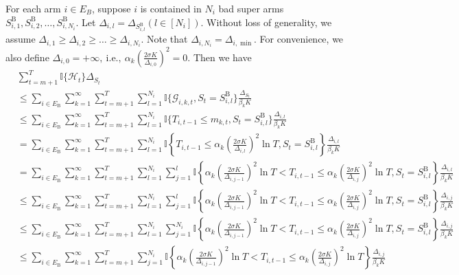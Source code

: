 \documentclass[opre,sglanonrev]{informs4}
\begin{document}
For each arm $i\in E_B$, suppose $i$ is contained in $N_i$ bad super arms $S_{i,1}^\mathrm{B},S_{i,2}^\mathrm{B},\ldots,S_{i,N_i}^\mathrm{B}$. Let $\Delta_{i,l} = \Delta_{S_{i,l}^\mathrm{B}}(l\in[N_i])$. Without loss of generality, we assume $\Delta_{i,1}\geq\Delta_{i,2}\geq\ldots\geq\Delta_{i,N_i}$. Note that $\Delta_{i,N_i}=\Delta_{i,\min}$. For convenience, we also define $\Delta_{i,0}=+\infty,\mathrm{~i.e.,~}\alpha_k\left(\frac{2\sigma K}{\Delta_{i,0}}\right)^2=0$. Then we have
$$\begin{aligned}
 & \sum_{t=m+1}^T\mathbb{I}\{\mathcal{H}_t\}\Delta_{S_t} \\
 & \leq\sum_{i\in E_\mathrm{B}}\sum_{k=1}^\infty\sum_{t=m+1}^T\sum_{l=1}^{N_i}\mathbb{I}\{\mathcal{G}_{i,k,t},S_t=S_{i,l}^\mathrm{B}\}\frac{\Delta_{S_t}}{\beta_kK} \\
 & \leq\sum_{i\in E_\mathrm{B}}\sum_{k=1}^\infty\sum_{t=m+1}^T\sum_{l=1}^{N_i}\mathbb{I}\{T_{i,t-1}\leq m_{k,t},S_t=S_{i,l}^\mathrm{B}\}\frac{\Delta_{i,l}}{\beta_kK} \\
 & =\sum_{i\in E_\mathrm{B}}\sum_{k=1}^\infty\sum_{t=m+1}^T\sum_{l=1}^{N_i}\mathbb{I}\left\{T_{i,t-1}\leq\alpha_k\left(\frac{2\sigma K}{\Delta_{i,l}}\right)^2\ln T,S_t=S_{i,l}^\mathrm{B}\right\}\frac{\Delta_{i,l}}{\beta_kK} \\
 & =\sum_{i\in E_{\mathrm{B}}}\sum_{k=1}^{\infty}\sum_{t=m+1}^{T}\sum_{l=1}^{N_{i}}\sum_{j=1}^{l}\mathbb{I}\left\{\alpha_k\left(\frac{2\sigma K}{\Delta_{i,j-1}}\right)^{2}\ln T<T_{i,t-1}\leq\alpha_k\left(\frac{2\sigma K}{\Delta_{i,j}}\right)^{2}\ln T,S_{t}=S_{i,l}^{\mathrm{B}}\right\}\frac{\Delta_{i,l}}{\beta_{k}K} \\
 &\leq\sum_{i\in E_{\mathrm{B}}}\sum_{k=1}^{\infty}\sum_{t=m+1}^{T}\sum_{l=1}^{N_{i}}\sum_{j=1}^{l}\mathbb{I}\left\{\alpha_k\left(\frac{2\sigma K}{\Delta_{i,j-1}}\right)^{2}\ln T<T_{i,t-1}\leq\alpha_k\left(\frac{2\sigma K}{\Delta_{i,j}}\right)^{2}\ln T,S_{t}=S_{i,l}^{\mathrm{B}}\right\}\frac{\Delta_{i,j}}{\beta_{k}K}\\
 &\leq\sum_{i\in E_{\mathrm{B}}}\sum_{k=1}^{\infty}\sum_{t=m+1}^{T}\sum_{l=1}^{N_{i}}\sum_{j=1}^{N_{i}}\mathbb{I}\left\{\alpha_k\left(\frac{2\sigma K}{\Delta_{i,j-1}}\right)^{2}\ln T<T_{i,t-1}\leq\alpha_k\left(\frac{2\sigma K}{\Delta_{i,j}}\right)^{2}\ln T,S_{t}=S_{i,l}^{\mathrm{B}}\right\}\frac{\Delta_{i,j}}{\beta_{k}K}\\
 & \leq\sum_{i\in E_\mathrm{B}}\sum_{k=1}^\infty\sum_{t=m+1}^T\sum_{j=1}^{N_i}\mathbb{I}\left\{\alpha_k\left(\frac{2\sigma K}{\Delta_{i,j-1}}\right)^2\ln T<T_{i,t-1}\leq\alpha_k\left(\frac{2\sigma K}{\Delta_{i,j}}\right)^2\ln T\right\}\frac{\Delta_{i,j}}{\beta_kK}\\
 \end{aligned}$$
\end{document}
